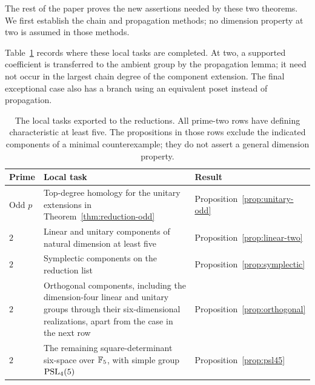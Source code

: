 The rest of the paper proves the new assertions needed by these two
theorems. We first establish the chain and propagation methods; no
dimension property at two is assumed in those methods.

Table~\ref{tab:local-targets} records where these local tasks are
completed. At two, a supported coefficient is transferred to the
ambient group by the propagation lemma; it need not occur in the
largest chain degree of the component extension. The final exceptional
case also has a branch using an equivalent poset instead of propagation.

\begin{table}[ht]
\centering
\small
\begin{tabular}{@{}>{\raggedright\arraybackslash}p{.11\linewidth}>{\raggedright\arraybackslash}p{.60\linewidth}>{\raggedright\arraybackslash}p{.20\linewidth}@{}}
\toprule
Prime & Local task & Result \\
\midrule
Odd $p$ & Top-degree homology for the unitary extensions in
Theorem~\ref{thm:reduction-odd} &
Proposition~\ref{prop:unitary-odd} \\[3pt]
$2$ & Linear and unitary components of natural dimension at least five &
Proposition~\ref{prop:linear-two} \\[3pt]
$2$ & Symplectic components on the reduction list &
Proposition~\ref{prop:symplectic} \\[3pt]
$2$ & Orthogonal components, including the dimension-four linear and
unitary groups through their six-dimensional realizations, apart from
the case in the next row &
Proposition~\ref{prop:orthogonal} \\[3pt]
$2$ & The remaining square-determinant six-space over $\mathbb F_5$,
with simple group $\operatorname{PSL}_4(5)$ & Proposition~\ref{prop:psl45} \\
\bottomrule
\end{tabular}
\caption{The local tasks exported to the reductions. All prime-two
rows have defining characteristic at least five. The propositions in
those rows exclude the indicated components of a minimal
counterexample; they do not assert a general dimension property.}
\label{tab:local-targets}
\end{table}
